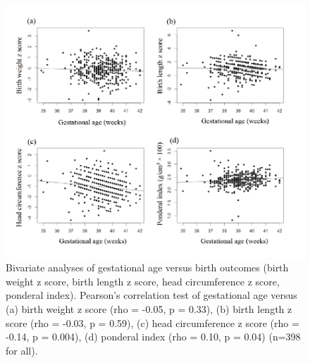 \begin{figure}
  \centering
    \label{fig:Fig325}
  \includegraphics[scale=1]{Figures/Fig325.pdf}
  \caption[Bivariate analyses of gestational age versus birth outcomes (birth weight z score, birth length z score, head circumference z score, ponderal index)]{Bivariate analyses of gestational age versus birth outcomes (birth weight z score, birth length z score, head circumference z score, ponderal index). Pearson's correlation test of gestational age versus (a) birth weight z score (rho = -0.05, p = 0.33), (b) birth length z score (rho = -0.03, p = 0.59), (c) head circumference z score (rho = -0.14, p = 0.004), (d) ponderal index (rho = 0.10, p = 0.04) (n=398 for all).}
\end{figure}


